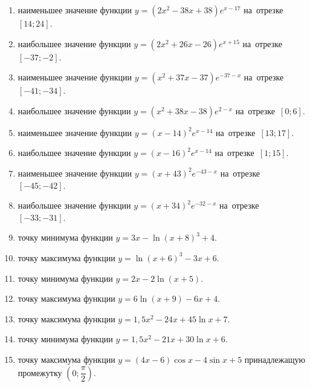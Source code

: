 \documentclass[a4paper,10pt]{article}
\begin{document}
\begin{enumerate}
\item {} наименьшее значение функции $y=\left(2x^2 -38x +38\right)e^{x -17}$ на~отрезке~$\left[14;24\right]$.

\item {} наибольшее значение функции $y=\left(2x^2 +26x -26\right)e^{x+15}$ на~отрезке~$\left[-37;-2\right]$.

\item {} наименьшее значение функции $y=\left(x^2 +37x -37\right)e^{-37-x}$ на~отрезке~$\left[-41;-34\right]$.

\item {} наибольшее значение функции $y=\left(x^2 +38x -38\right)e^{2-x}$ на~отрезке~$\left[0;6\right]$.

\item {} наименьшее значение функции $y=\left(x-14\right)^2e^{x-14}$ на~отрезке~$\left[13;17\right]$.

\item {} наибольшее значение функции $y=\left(x-16\right)^2e^{x-14}$ на~отрезке~$\left[1;15\right]$.

\item {} наименьшее значение функции $y=\left(x+43\right)^2e^{-43-x}$ на~отрезке~$\left[-45;-42\right]$.

\item {} наибольшее значение функции $y=\left(x+34\right)^2e^{-32-x}$ на~отрезке~$\left[-33;-31\right]$.

\item {} точку минимума функции $y=3x-\ln\left(x+8\right)^{3}+4$.

\item {} точку максимума функции $y=\ln\left(x+6\right)^{3}-3x+6$.

\item {} точку минимума функции $y=2x-2\ln\left(x+5\right)$.

\item {} точку максимума функции $y=6\ln\left(x+9\right)-6x+4$.

\item {} точку максимума функции $y=1,5x^2-24x+45\ln x +7$.

\item {} точку минимума функции $y=1,5x^2-21x+30\ln x +6$.

\item {} точку максимума функции $y=\left(4x-6\right)\cos x -4\sin x+5$
принадлежащую промежутку $\left(0;\dfrac{\pi}{2}\right)$.


\end{enumerate}
\end{document}
